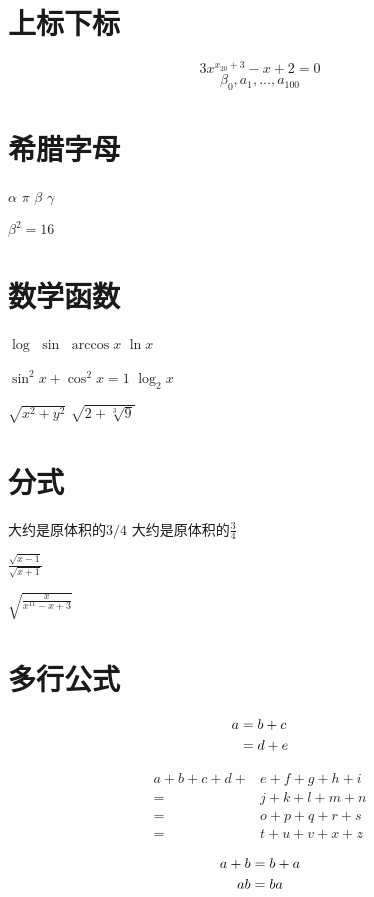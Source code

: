 \documentclass{article}
\begin{document}
\section{上标下标}
    $$3x^{x_{20} + 3} - x + 2 = 0$$
    $$\beta_0,a_1,...,a_{100}$$

\section{希腊字母} 
    $\alpha$
    $\pi$
    $\beta$
    $\gamma$

    $\beta^2 = 16$

\section{数学函数}
    $\log$
    $\sin$
    $\arccos x$
    $\ln x$

    $\sin^2 x+\cos^2 x = 1$
    $\log_2 x$

    $\sqrt{x ^ 2 + y ^ 2}$
    $\sqrt{2 + \sqrt[3]{9}}$ %

\section{分式}
    大约是原体积的$3/4$
    大约是原体积的$\frac{3}{4}$

    $\frac{\sqrt{x-1}}{\sqrt{x+1}}$

    $\sqrt{\frac{x}{x^{11} - x + 3}}$



\section{多行公式}
    \begin{align} 
    a & = b + c \notag \\ 
    &=d+e 
    \end{align}
    
    \[
    \begin{aligned}  %
    a+b+c+d+& e+f+g+h+i \\
    =& j+k+l+m+n \\
    =& o+p+q+r+s \\ 
    =& t+u+v+x+z \end{aligned}
    \]

    \begin{gather}
    a+b=b+a \notag \\
    ab = ba    
    \end{gather}
\end{document}
